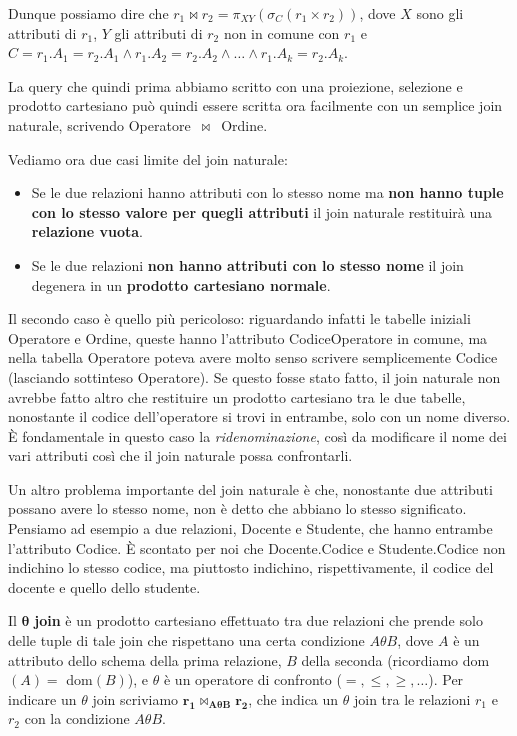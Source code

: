 \documentclass[11pt, a4paper, titlepage, oneside]{scrbook}
\begin{document}
Dunque possiamo dire che $r_1 \bowtie r_2 = \pi_{XY}(\sigma_C(r_1 \times r_2))$, dove $X$ sono gli attributi di $r_1$, $Y$ gli attributi di $r_2$ non in comune con $r_1$ e $C = r_1.A_1 = r_2.A_1 \land r_1.A_2 = r_2.A_2 \land \ldots \land r_1.A_k = r_2.A_k$.

La query che quindi prima abbiamo scritto con una proiezione, selezione e prodotto cartesiano può quindi essere scritta ora facilmente con un semplice join naturale, scrivendo \mbox{Operatore $\bowtie$ Ordine}.  

\begin{Proprieta}
\label{prop-casi-limite-join-naturale}
Vediamo ora due casi limite del join naturale:
\begin{itemize}
    \item Se le due relazioni hanno attributi con lo stesso nome ma \textbf{non hanno tuple con lo stesso valore per quegli attributi} il join naturale  restituirà una \textbf{relazione vuota}.
    \item Se le due relazioni \textbf{non hanno attributi con lo stesso nome} il join degenera in un \textbf{prodotto cartesiano normale}.
\end{itemize}
\end{Proprieta}

Il secondo caso è quello più pericoloso: riguardando infatti le tabelle iniziali Operatore e Ordine, queste hanno l'attributo CodiceOperatore in comune, ma nella tabella Operatore poteva avere molto senso scrivere semplicemente Codice (lasciando sottinteso Operatore). Se questo fosse stato fatto, il join naturale non avrebbe fatto altro che restituire un prodotto cartesiano tra le due tabelle, nonostante il codice dell'operatore si trovi in entrambe, solo con un nome diverso. È fondamentale in questo caso la \textit{ridenominazione}, così da modificare il nome dei vari attributi così che il join naturale possa confrontarli. 

Un altro problema importante del join naturale è che, nonostante due attributi possano avere lo stesso nome, non è detto che abbiano lo stesso significato. Pensiamo ad esempio a due relazioni, Docente e Studente, che hanno entrambe l'attributo Codice. È scontato per noi che Docente.Codice e Studente.Codice non indichino lo stesso codice, ma piuttosto indichino, rispettivamente, il codice del docente e quello dello studente.

\begin{Definizione}
\label{def-theta-join}
Il $\bm{\theta}$ \textbf{join} è un prodotto cartesiano effettuato tra due relazioni che prende solo delle tuple di tale join che rispettano una certa condizione $A \theta B$, dove $A$ è un attributo dello schema della prima relazione, $B$ della seconda (ricordiamo dom$(A) =$ dom$(B)$), e $\theta$ è un operatore di confronto ($=, \leq, \geq, \ldots$). Per indicare un $\theta$ join scriviamo $\bm{r_1 \bowtie_{A \theta B} r_2 }$, che indica un $\theta$ join tra le relazioni $r_1$ e $r_2$ con la condizione $A \theta B$.
\end{Definizione}
\end{document}
